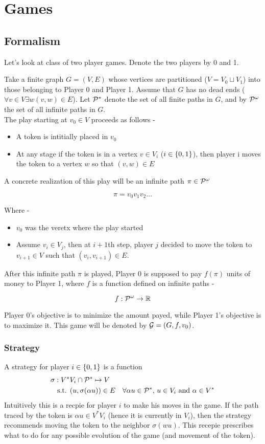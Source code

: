 \chapter{Games}

\section{Formalism}
\label{sec:formalism}
Let's look at class of two player games. Denote the two players by 0 and 1.

Take a finite graph $G=(V,E)$ whose vertices are partitioned ($V = V_0 \sqcup V_1$) into those belonging to Player 0 and Player 1. Assume that $G$ has no dead ends ($\forall v \in V \exists w  (v,w) \in E$). Let $\mathcal{P}^{*}$ denote the set of all finite paths in $G$, and by $\mathcal{P}^\omega$ the set of all infinite paths in $G$.\\
The play starting at $v_0 \in V$ proceeds as follows -
\begin{itemize}
  \item A token is intitially placed in $v_0$
  \item At any stage if the token is in a vertex $v \in V_i$ ($i \in \{0,1\}$), then
        player i moves the token to a vertex $w$ so that $(v,w) \in E$
\end{itemize}
A concrete realization of this play will be an infinite path $\pi \in \mathcal{P}^\omega$

\[
  \pi = v_0 v_1 v_2 \ldots
\]

Where -
\begin{itemize}
  \item $v_0$ was the veretx where the play started
  \item Assume $v_i \in V_j$, then at $i+1$th step, player $j$ decided to move the token to $v_{i+1} \in V$ such that $(v_i,v_{i+1}) \in E$.
\end{itemize}

After this infinite path $\pi$ is played, Player 0 is supposed to pay $f(\pi)$ units of money to Player 1, where $f$ is a function defined on infinite paths -

\[
    f : \mathcal{P}^\omega \to \mathbb{R}
\]

Player 0's objective is to minimize the amount payed, while Player 1's objective is to maximize it.
This game will be denoted by $\mathcal{G}=(G,f,v_0)$.

\subsection{Strategy}
A strategy for player $i \in \{0,1\}$ is a function 
\begin{align}
    \sigma &: V^{*}V_i \cap \mathcal{P}^{*} \mapsto V \\
    &\text{ s.t. } (u,\sigma(\alpha u)) \in E \quad \forall \alpha u \in \mathcal{P}^{*},\, u \in V_i \text{ and } \alpha \in V^*
\end{align}
Intuitively this is a recpie for player $i$ to make his moves in the game. If the path traced by the token is $\alpha u \in V^{*}V_i$ (hence it is currently in $V_i$), then the strategy recommends moving the token to the neighbor $\sigma(wu)$. This recepie prescribes what to do for any possible evolution of the game (and movement of the token).

